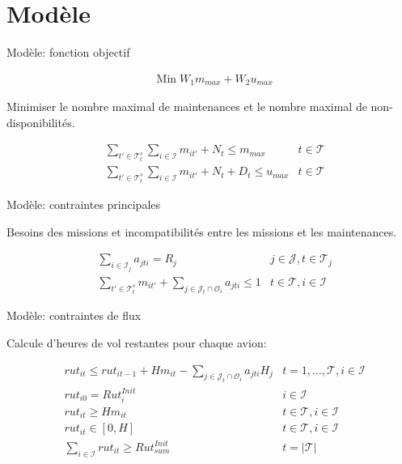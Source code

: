 \documentclass[ignorenonframetext,]{beamer}
\begin{document}
\section{Modèle}\label{modele}

\begin{frame}{Modèle: fonction objectif}

\begin{align}
    & \text{Min}\; W_1 m_{max} + W_2 u_{max}
\end{align}

\pause

Minimiser le nombre maximal de maintenances et le nombre maximal de
non-disponibilités.

\begin{align}
    &\sum_{t' \in \mathcal{T}^{s}_t} \sum_{i \in \mathcal{I}} m_{it'} + N_t \leq m_{max}
    &t \in \mathcal{T} \\
    &\sum_{t' \in \mathcal{T}^{s}_t} \sum_{i \in \mathcal{I}} m_{it'} + N_t + D_t\leq u_{max}
    &t \in \mathcal{T}
\end{align}

\end{frame}

\begin{frame}{Modèle: contraintes principales}

Besoins des missions et incompatibilités entre les missions et les
maintenances.

\begin{align}
&\sum_{i \in \mathcal{I}_j} a_{jti} = R_j
&j \in \mathcal{J}, t \in \mathcal{T}_j\\
&\sum_{t' \in \mathcal{T}^{s}_t} m_{it'} + \sum_{j \in \mathcal{J}_t \cap \mathcal{O}_i} a_{jti} \leq 1
& t \in \mathcal{T}, i \in \mathcal{I}
\end{align}

\end{frame}

\begin{frame}{Modèle: contraintes de flux}

Calcule d'heures de vol restantes pour chaque avion:

\begin{align}
& rut_{it} \leq rut_{it-1} + H m_{it} - \sum_{j \in \mathcal{J}_t \cap \mathcal{O}_i} a_{jti} H_j & t =1, ..., \mathcal{T}, i \in \mathcal{I}\\
& rut_{i0} = Rut^{Init}_i
        & i \in \mathcal{I}\\
& rut_{it} \geq H m_{it}
        & t \in \mathcal{T}, i \in \mathcal{I}\\
& rut_{it} \in [0,H]
        & t \in \mathcal{T}, i \in \mathcal{I} \\
& \sum_{i \in \mathcal{I}} rut_{it} \geq Rut^{Init}_{sum}
        & t = |\mathcal{T}|
\end{align}

\end{frame}
\end{document}
